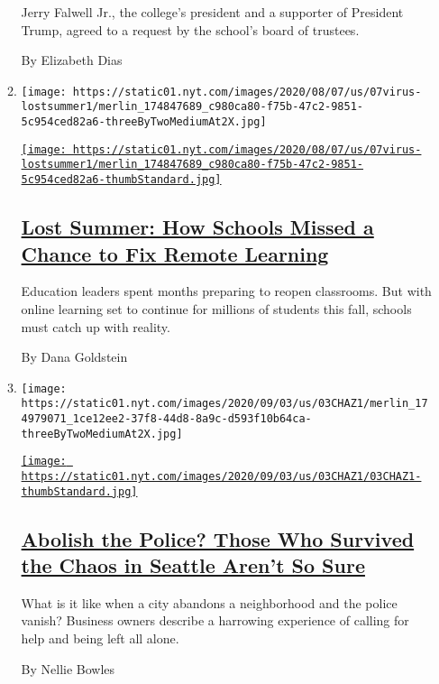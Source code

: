 \begin{enumerate}
\begin{enumerate}
    Jerry Falwell Jr., the college's president and a supporter of
    President Trump, agreed to a request by the school's board of
    trustees.

    By Elizabeth Dias
  \item
    \texttt{[image: https://static01.nyt.com/images/2020/08/07/us/07virus-lostsummer1/merlin\_174847689\_c980ca80-f75b-47c2-9851-5c954ced82a6-threeByTwoMediumAt2X.jpg]}

    \href{/2020/08/07/us/remote-learning-fall-2020.html}{\texttt{[image: https://static01.nyt.com/images/2020/08/07/us/07virus-lostsummer1/merlin\_174847689\_c980ca80-f75b-47c2-9851-5c954ced82a6-thumbStandard.jpg]}}

    \hypertarget{lost-summer-how-schools-missed-a-chance-to-fix-remote-learning}{%
    \subsection{\texorpdfstring{\href{/2020/08/07/us/remote-learning-fall-2020.html}{Lost
    Summer: How Schools Missed a Chance to Fix Remote
    Learning}}{Lost Summer: How Schools Missed a Chance to Fix Remote Learning}}\label{lost-summer-how-schools-missed-a-chance-to-fix-remote-learning}}

    Education leaders spent months preparing to reopen classrooms. But
    with online learning set to continue for millions of students this
    fall, schools must catch up with reality.

    By Dana Goldstein
  \item
    \texttt{[image: https://static01.nyt.com/images/2020/09/03/us/03CHAZ1/merlin\_174979071\_1ce12ee2-37f8-44d8-8a9c-d593f10b64ca-threeByTwoMediumAt2X.jpg]}

    \href{/2020/08/07/us/defund-police-seattle-protests.html}{\texttt{[image: https://static01.nyt.com/images/2020/09/03/us/03CHAZ1/03CHAZ1-thumbStandard.jpg]}}

    \hypertarget{abolish-the-police-those-who-survived-the-chaos-in-seattle-arent-so-sure}{%
    \subsection{\texorpdfstring{\href{/2020/08/07/us/defund-police-seattle-protests.html}{Abolish
    the Police? Those Who Survived the Chaos in Seattle Aren't So
    Sure}}{Abolish the Police? Those Who Survived the Chaos in Seattle Aren't So Sure}}\label{abolish-the-police-those-who-survived-the-chaos-in-seattle-arent-so-sure}}

    What is it like when a city abandons a neighborhood and the police
    vanish? Business owners describe a harrowing experience of calling
    for help and being left all alone.

    By Nellie Bowles
  \end{enumerate}
\end{enumerate}

